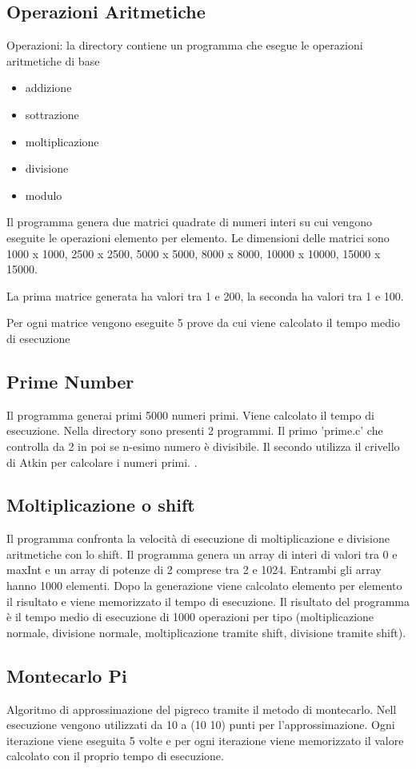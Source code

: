 \documentclass[12pt,a4paper]{report}
\begin{document}
\subsection{Operazioni Aritmetiche}
Operazioni: la directory contiene un programma che esegue le operazioni aritmetiche di base 
\begin{itemize}
	\item addizione
	\item sottrazione
	\item moltiplicazione
	\item divisione
	\item modulo
\end{itemize} 
Il programma genera due matrici quadrate di numeri interi su cui vengono eseguite le operazioni elemento per elemento. Le dimensioni delle matrici sono 1000 x 1000, 2500 x 2500, 5000 x 5000, 8000 x 8000, 10000 x 10000, 15000 x 15000.

La prima matrice generata ha valori tra 1 e 200, la seconda ha valori tra 1 e 100.

Per ogni matrice vengono eseguite 5 prove da cui viene calcolato il tempo medio di esecuzione

\subsection{Prime Number}
Il programma generai primi 5000 numeri primi. Viene calcolato il tempo di esecuzione. Nella directory sono presenti 2 programmi. Il primo 'prime.c' che controlla da 2 in poi se n-esimo numero è divisibile. 
Il secondo utilizza il crivello di Atkin per calcolare i numeri primi. .

\subsection{Moltiplicazione o shift}
Il programma confronta la velocità di esecuzione di moltiplicazione e divisione aritmetiche con lo shift. Il programma genera un array di interi di valori tra 0 e maxInt e un array di potenze di 2 comprese tra 2 e 1024. Entrambi gli array hanno 1000 elementi. Dopo la generazione viene calcolato elemento per elemento il risultato e viene memorizzato il tempo di esecuzione. Il risultato del programma è il tempo medio di esecuzione di 1000 operazioni per tipo (moltiplicazione normale, divisione normale, moltiplicazione tramite shift, divisione tramite shift).

\subsection{Montecarlo Pi}
Algoritmo di approssimazione del pigreco tramite il metodo di montecarlo. Nell esecuzione vengono utilizzati da 10 a (10 10) punti per l'approssimazione. Ogni iterazione viene eseguita 5 volte e per ogni iterazione viene memorizzato il valore calcolato con il proprio tempo di esecuzione.
\end{document}
